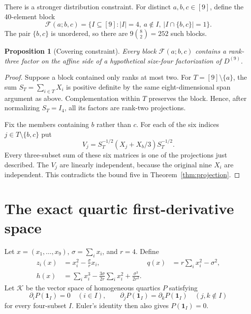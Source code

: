 \documentclass[11pt]{article}
\newtheorem{proposition}[theorem]{Proposition}
\theoremstyle{remark}\newtheorem{remark}[theorem]{Remark}
\newcommand{\one}{\mathbf 1}
\begin{document}
There is a stronger distribution constraint. For distinct $a,b,c\in[9]$, define the 40-element block
\[
 \mathcal F(a;b,c)=\{I\subseteq[9]:|I|=4,\ a\notin I,\ |I\cap\{b,c\}|=1\}.
\]
The pair $\{b,c\}$ is unordered, so there are $9\binom82=252$ such blocks.

\begin{proposition}[Covering constraint]\label{prop:cover}
Every block $\mathcal F(a;b,c)$ contains a rank-three factor on the affine side of a hypothetical size-four factorization of $D^{(9)}$.
\end{proposition}
\begin{proof}
Suppose a block contained only ranks at most two. For $T=[9]\setminus\{a\}$, the sum $S_T=\sum_{i\in T}X_i$ is positive definite by the same eight-dimensional span argument as above. Complementation within $T$ preserves the block. Hence, after normalizing $S_T=I_4$, all its factors are rank-two projections.

Fix the members containing $b$ rather than $c$. For each of the six indices $j\in T\setminus\{b,c\}$ put
\[
 V_j=S_T^{-1/2}(X_j+X_b/3)S_T^{-1/2}.
\]
Every three-subset sum of these six matrices is one of the projections just described. The $V_j$ are linearly independent, because the original nine $X_i$ are independent. This contradicts the bound five in Theorem~\ref{thm:projection}.
\end{proof}

\section{The exact quartic first-derivative space}
Let $x=(x_1,\ldots,x_9)$, $\sigma=\sum_i x_i$, and $r=4$. Define
\begin{align}
 z_i(x)&=x_i^2-\frac{\sigma}{r}x_i, &
 q(x)&=r\sum_i x_i^2-\sigma^2,\label{eq:zq}\\
 h(x)&=\sum_i x_i^3-\frac{3\sigma}{2r}\sum_i x_i^2
                         +\frac{\sigma^3}{2r^2}.\label{eq:h}
\end{align}
Let $\mathcal K$ be the vector space of homogeneous quartics $P$ satisfying
\begin{equation}\label{eq:jet}
 \partial_iP(\one_I)=0\quad(i\in I),\qquad
 \partial_jP(\one_I)=\partial_kP(\one_I)\quad(j,k\notin I)
\end{equation}
for every four-subset $I$. Euler's identity then also gives $P(\one_I)=0$.
\end{document}
